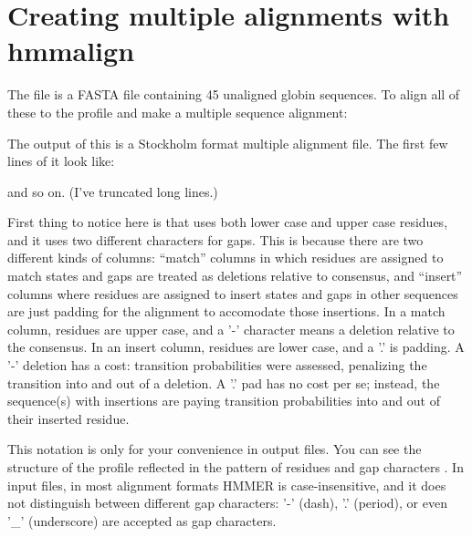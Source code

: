 \section{Creating multiple alignments with hmmalign}

The file  is a FASTA file containing 45
unaligned globin sequences. To align all of these to the
 profile and make a multiple sequence alignment:

   \vspace{1ex}
   \vspace{1ex}

The output of this is a Stockholm format multiple alignment file. The
first few lines of it look like:


and so on. (I've truncated long lines.)

First thing to notice here is that  uses both lower
case and upper case residues, and it uses two different characters for
gaps.  This is because there are two different kinds of columns:
``match'' columns in which residues are assigned to match states and
gaps are treated as deletions relative to consensus, and ``insert''
columns where residues are assigned to insert states and gaps in other
sequences are just padding for the alignment to accomodate those
insertions. In a match column, residues are upper case, and a '-'
character means a deletion relative to the consensus. In an insert
column, residues are lower case, and a '.' is padding.  A '-' deletion
has a cost: transition probabilities were assessed, penalizing the
transition into and out of a deletion. A '.' pad has no cost per se;
instead, the sequence(s) with insertions are paying transition
probabilities into and out of their inserted residue.

This notation is only for your convenience in output files. You can
see the structure of the profile reflected in the pattern of
residues and gap characters .  In input files, in
most alignment formats HMMER is
case-insensitive, and it does not distinguish between different gap
characters: '-' (dash), '.' (period), or even '\_' (underscore) are
accepted as gap characters.

